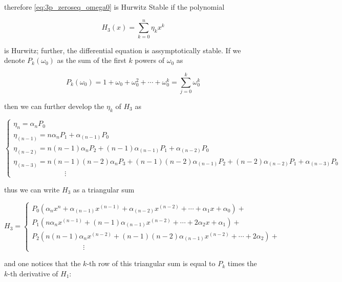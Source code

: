 	\noindent therefore \eqref{eq:3p_zeroseq_omega0} is Hurwitz Stable if the polynomial

\begin{equation} H_3(x) = \sum_{k=0}^n \eta_k x^k \end{equation}

	\noindent is Hurwitz; further, the differential equation is assymptotically stable. If we denote $P_k(\omega_0)$ as the sum of the first $k$ powers of $\omega_0$ as

\begin{equation} P_k\left(\omega_0\right) = 1 + \omega_0 + \omega_0^2 + \cdots + \omega_0^k = \sum_{j=0}^k \omega_0^k \end{equation}

	\noindent then we can further develop the $\eta_k$ of $H_3$ as

\begin{equation}
\left\{\begin{array}{l}
	\eta_n = \alpha_n P_0 \\[3mm]
%
	\eta_{(n-1)} = n\alpha_nP_1 + \alpha_{(n-1)}P_0\\[3mm]
%
	\eta_{(n-2)} = n(n-1)\alpha_n P_2 + (n-1)\alpha_{(n-1)}P_1 + \alpha_{(n-2)}P_0\\[3mm]
%
	\eta_{(n-3)} = n(n-1)(n-2)\alpha_n P_3+ (n-1)(n-2)\alpha_{(n-1)}P_2 + (n-2)\alpha_{(n-2)}P_1 + \alpha_{(n-3)}P_0\\[3mm]
%
	\hspace{3cm}\vdots
\end{array}\right.
\end{equation}

	\noindent thus we can write $H_3$ as a triangular sum

\begin{equation}
H_3 = \left\{\begin{array}{l}
	P_0\left(\alpha_n x^n + \alpha_{(n-1)}x^{(n-1)} + \alpha_{(n-2)}x^{(n-2)} + \cdots + \alpha_1x + \alpha_0\right) + \\[3mm]
%
	P_1\left( n\alpha_{n}x^{(n-1)} + (n-1)\alpha_{(n-1)}x^{(n-2)} + \cdots + 2\alpha_2x + \alpha_1\right) + \\[3mm]
%
	P_2\left( n(n-1)\alpha_{n}x^{(n-2)} + (n-1)(n-2)\alpha_{(n-1)}x^{(n-2)} + \cdots + 2\alpha_2\right) + \\[3mm]
%
	\hspace{3cm}\vdots
\end{array}\right.
\end{equation}

	\noindent and one notices that the $k$-th row of this triangular sum is equal to $P_k$ times the $k$-th derivative of $H_1$:

